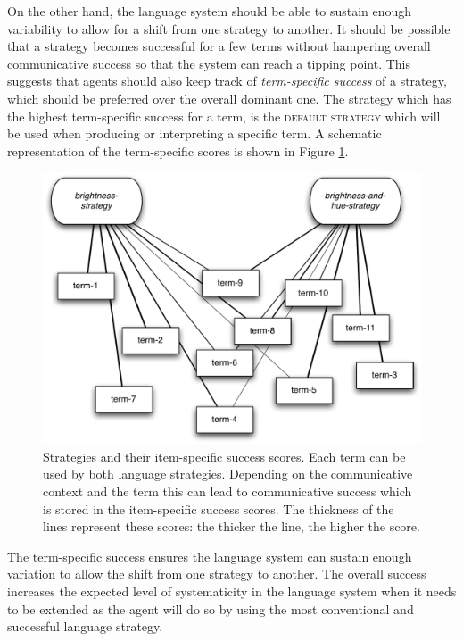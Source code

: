 On the other hand, the language system should be able to sustain
enough variability to allow for a shift from one strategy to
another. It should be possible that a strategy becomes successful for
a few terms without hampering overall communicative success so that
the system can reach a tipping point. This suggests that agents should
also keep track of \emph{term-specific success} of a strategy, which
should be preferred over the overall dominant one. The strategy which
has the highest term-specific success for a term, is the \textsc{default
  strategy} which will be used when producing or interpreting a
specific term. A schematic representation of the term-specific scores
is shown in Figure \ref{f:ls-strategies-and-scores}.

\begin{figure}[htpb]
  \begin{center}
    \includegraphics[width=.8\textwidth]{./selection/figures/strategies-scores.pdf}
    \caption[Strategies and their item-specific success
    scores]{Strategies and their item-specific success scores. Each
      term can be used by both language strategies. Depending on the
      communicative context and the term this can lead to
      communicative success which is stored in the item-specific
      success scores. The thickness of the lines represent these
      scores: the thicker the line, the higher the score.}
    \label{f:ls-strategies-and-scores}
  \end{center}
\end{figure}

The term-specific success ensures the language system can sustain
enough variation to allow the shift from one strategy to another. The
overall success increases the expected level of systematicity in the
language system when it needs to be extended as the agent will do so
by using the most conventional and successful language strategy.

